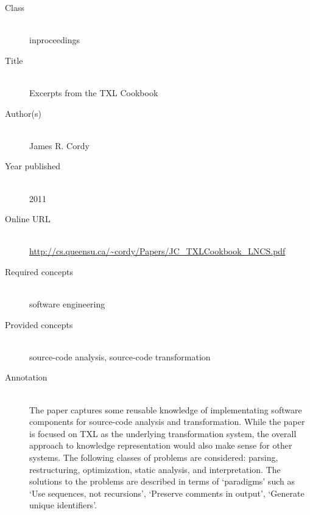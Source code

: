 \begin{description}
\item[Class]\mbox{}\\
inproceedings
\item[Title]\mbox{}\\
Excerpts from the TXL Cookbook
\item[Author(s)]\mbox{}\\
James R. Cordy\item[Year published]\mbox{}\\
2011
\item[Online URL]\mbox{}\\
{\footnotesize\url{http://cs.queensu.ca/~cordy/Papers/JC_TXLCookbook_LNCS.pdf}}
\item[Required concepts]\mbox{}\\
software engineering\item[Provided concepts]\mbox{}\\
source-code analysis, source-code transformation\item[Annotation]\mbox{}\\
The paper captures some reusable knowledge of implementating software components for source-code analysis and transformation. While the paper is focused on TXL as the underlying transformation system, the overall approach to knowledge representation would also make sense for other systems. The following classes of problems are considered: parsing, restructuring, optimization, static analysis, and interpretation. The solutions to the problems are described in terms of `paradigms' such as `Use sequences, not recursions', `Preserve comments in output', `Generate unique identifiers'.
\end{description}

